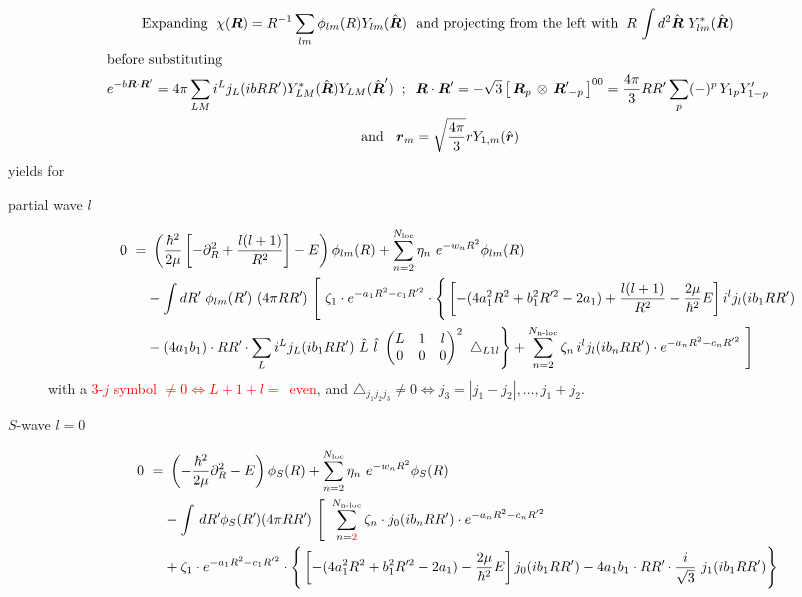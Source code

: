\documentclass[onecolumn,preprint,superscriptaddress,nofootinbib,notitlepage,10pt,linenumbers]{revtex4-1}
\newcommand*{\mprime}{^{\prime}\mkern-1.2mu}
\newcommand{\red}[1]{\textcolor{red}{#1}}
\newcommand{\la}{\label}
\newcommand{\ve}[1]{\ensuremath{\boldsymbol{#1}}}
\newcommand{\coup}[3]{\left[\,#1\,\otimes\,#2\,\right]^{#3}}
\newcommand{\threej}[6]{ \begin{pmatrix}
   #1 & #2 & #3 \\
   #4 & #5 & #6 
  \end{pmatrix}}
\begin{document}
\begin{gather}
\text{Expanding}~\;\chi(\ve{R})=R^{-1}\sum_{lm}\phi_{lm}(R)Y_{lm}(\hat{\ve{R}})~
\text{~and projecting from the left with}\;\;
R\,\int d^2\hat{\ve{R}}~Y^*_{lm}(\hat{\ve{R}})\\
\intertext{before substituting}
e^{-b\ve{R}\cdot\ve{R}'}=4\pi\sum_{LM}i^Lj_L(ib RR')Y^*_{LM}(\hat{\ve{R}})Y_{LM}(\hat{\ve{R}}')\;\;;\;\;
\ve{R}\cdot\ve{R}'=-\sqrt{3}\coup{\ve{R}_p}{\ve{R}\mprime_{-p}}{00}=\frac{4\pi}{3}RR'\sum_p(-)^p\,Y_{1p}Y'_{1-p}\nonumber\\
~\text{and~}\;\;\ve{r}_m=\sqrt{\frac{4\pi}{3}}rY_{1,m}(\hat{\ve{r}})
\end{gather}
yields for
\begin{description}
	\item[partial wave $l$]
\begin{subequations}\la{eq.rgm.sglnonloc.pw}
\begin{align}
0~=&~\left(\frac{\hbar^2}{2\mu}\left[-\partial^2_R+\frac{l(l+1)}{R^2}\right]-E\right)
\phi_{lm}(R)+\sum_{n=2}^{N_{\text{loc}}}\eta_n~e^{-w_nR^2}\phi_{lm}(R)\\
%
&-\int dR\mprime~\phi_{lm}(R\mprime)~(4\pi RR\mprime )~\Bigg[
%
~\zeta_1 \cdot e^{-a_1R^2-c_1R'^2}\cdot\Bigg\lbrace
\left[-(4a_1^2R^2+b_1^2R\mprime^2-2a_1)+\frac{l(l+1)}{R^2}-\frac{2\mu}{\hbar^2}E\right]
 i^l j_{l}(ib_1 RR')\nonumber\\
%
&-(4a_1b_1)\cdot RR\mprime\cdot
\sum_Li^Lj_L(ib_1 RR')~\hat{L}~\hat{l}~\threej{L}{1}{l}{0}{0}{0}^2~\triangle_{L1l}\Bigg\rbrace
%
+\sum_{n=2}^{N_{\text{n-loc}}}\zeta_n\,i^l j_l(ib_n RR')\cdot 
e^{-a_nR^2-c_nR'^2}~\Bigg]\la{eq.rgm.sglnonloc.pw.noloc}
\end{align}
\end{subequations}
with a \red{3-$j$ symbol $\neq0\Leftrightarrow L+1+l=$~even}, and $\triangle_{j_1j_2j_3}\neq0\Leftrightarrow j_3=|j_1-j_2|,\ldots,j_1+j_2$.

\item[$S$-wave $l=0$]
\begin{subequations}\la{eq.rgm.sglnonloc.pw}
\begin{align}
0~=&~\left(-\frac{\hbar^2}{2\mu}\partial^2_R-E\right)
\phi_{S}(R)+\sum_{n=2}^{N_{\text{loc}}}\eta_n~e^{-w_nR^2}\phi_{S}(R)\\
%
&-\int\,dR\mprime\phi_{S}(R\mprime)(4\pi RR\mprime )~\Bigg[
~\sum_{n=\red{2}}^{N_{\text{n-loc}}}\zeta_n\cdot j_0(ib_n RR')\cdot 
e^{-a_nR^2-c_nR'^2}
\\
&+\zeta_1 \cdot e^{-a_1R^2-c_1R'^2}
\cdot\Bigg\lbrace
\left[-(4a_1^2R^2+b_1^2R\mprime^2-2a_1)-\frac{2\mu}{\hbar^2}E\right]
 j_0(ib_1 RR')-4a_1b_1\cdot RR\mprime\cdot
\frac{i}{\sqrt{3}}~j_1(ib_1 RR')\Bigg\rbrace\nonumber
%
\la{eq.rgm.sglnonloc.pw.noloc}
\end{align}
\end{subequations}


\end{description}
\end{document}
